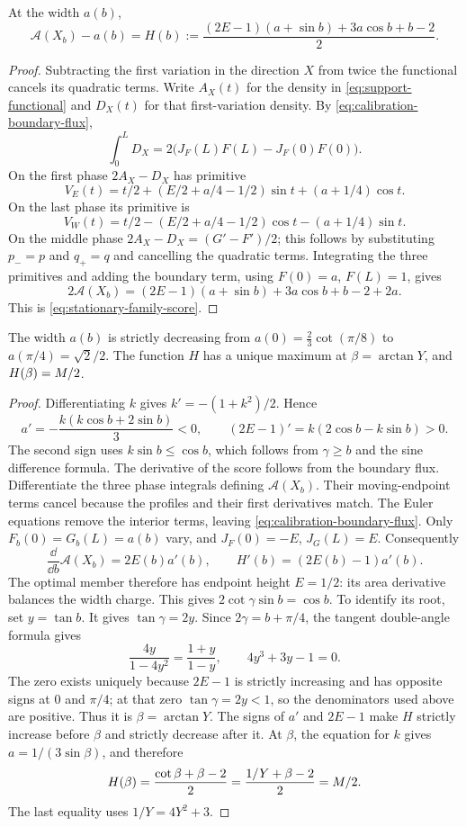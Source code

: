 \begin{lemma}\label{lem:stationary-family-value}
At the width $a(b)$,
\begin{equation}\label{eq:stationary-family-score}
 \mathcal A(X_b)-a(b)=
 H(b):=\frac{(2E-1)(a+\sin b)+3a\cos b+b-2}{2}.
\end{equation}
\end{lemma}
\begin{proof}
Subtracting the first variation in the direction $X$ from twice
the functional cancels its quadratic terms. Write $A_X(t)$ for
the density in \cref{eq:support-functional} and $D_X(t)$ for
that first-variation density.
By \cref{eq:calibration-boundary-flux},
\[
 \int_0^L D_X=2\bigl(J_F(L)F(L)-J_F(0)F(0)\bigr).
\]
On the first phase $2A_X-D_X$ has primitive
\[
 V_E(t)=t/2+(E/2+a/4-1/2)\sin t+(a+1/4)\cos t.
\]
On the last phase its primitive is
\[
 V_W(t)=t/2-(E/2+a/4-1/2)\cos t-(a+1/4)\sin t.
\]
On the middle phase $2A_X-D_X=(G'-F')/2$; this follows by
substituting $p_-=p$ and $q_+=q$ and cancelling the quadratic terms.
Integrating the three primitives and adding the boundary term,
using $F(0)=a$, $F(L)=1$, gives
\[
 2\mathcal A(X_b)=(2E-1)(a+\sin b)+3a\cos b+b-2+2a.
\]
This is \cref{eq:stationary-family-score}.
\end{proof}

\begin{lemma}\label{lem:calibration-scalar}
The width $a(b)$ is strictly decreasing from
$a(0)=\tfrac23\cot(\pi/8)$ to $a(\pi/4)=\sqrt2/2$.
The function $H$ has a unique maximum at
$\beta=\arctan Y$, and $H(\beta)=M/2$.
\end{lemma}
\begin{proof}
Differentiating $k$ gives $k'=-(1+k^2)/2$. Hence
\[
 a'=-\frac{k(k\cos b+2\sin b)}3<0,
 \qquad (2E-1)'=k(2\cos b-k\sin b)>0.
\]
The second sign uses $k\sin b\le\cos b$, which follows from
$\gamma\ge b$ and the sine difference formula.
The derivative of the score follows from the boundary flux.
Differentiate the three phase integrals defining $\mathcal A(X_b)$.
Their moving-endpoint terms cancel because the profiles and their
first derivatives match. The Euler equations remove the interior
terms, leaving \cref{eq:calibration-boundary-flux}.
Only $F_b(0)=G_b(L)=a(b)$ vary, and
$J_F(0)=-E$, $J_G(L)=E$. Consequently
\[
 \frac{\dd}{\dd b}\mathcal A(X_b)=2E(b)a'(b),\qquad
 H'(b)=(2E(b)-1)a'(b).
\]
The optimal member therefore has endpoint height $E=1/2$:
its area derivative balances the width charge. This gives
$2\cot\gamma\sin b=\cos b$.
To identify its root, set $y=\tan b$. It gives
$\tan\gamma=2y$. Since $2\gamma=b+\pi/4$,
the tangent double-angle formula gives
\[
 \frac{4y}{1-4y^2}=\frac{1+y}{1-y},\qquad
 4y^3+3y-1=0.
\]
The zero exists uniquely because $2E-1$ is strictly increasing
and has opposite signs at $0$ and $\pi/4$; at that zero
$\tan\gamma=2y<1$, so the denominators used above are positive.
Thus it is $\beta=\arctan Y$.
The signs of $a'$ and $2E-1$ make $H$ strictly increase before
$\beta$ and strictly decrease after it.
At $\beta$, the equation for $k$ gives
$a=1/(3\sin\beta)$, and therefore
\[
 H(\beta)=\frac{\cot\beta+\beta-2}{2}
       =\frac{1/Y+\beta-2}{2}=M/2.
\]
The last equality uses $1/Y=4Y^2+3$.
\end{proof}

